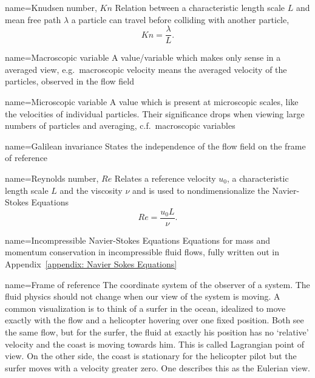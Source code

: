 
{
name={Knudsen number, $Kn$}
}
{Relation between a characteristic length scale $L$ and mean free path $\lambda$ a particle can travel before colliding with another particle,
\begin{equation}
  Kn=\frac{\lambda}{L}.
\end{equation}}

{
name={Macroscopic variable}
}
{A value/variable which makes only sense in a averaged view, e.g.\ macroscopic velocity means the averaged velocity of the particles, observed in the flow field
}

{
name={Microscopic variable}
}
{
A value which is present at microscopic scales, like the velocities of individual particles.
Their significance drops when viewing large numbers of particles and averaging, c.f.\ macroscopic variables
}

{
name={Galilean invariance}
}{States the independence of the flow field on the frame of reference}

{
name={Reynolds number, $Re$}
}
{Relates a reference velocity $u_0$, a characteristic length scale $L$ and the viscosity $\nu$ and is used to nondimensionalize the Navier-Stokes Equations
\begin{equation}
  \label{eq: definition of reynolds number}
  Re=\frac{u_0 L}{\nu}.
\end{equation}}

{
name={Incompressible Navier-Stokes Equations}
}
{Equations for mass and momentum conservation in incompressible fluid flows, fully written out in Appendix~\ref{appendix: Navier Sokes Equations}
}

{
name={Frame of reference}
}
{
The coordinate system of the observer of a system.
The fluid physics should not change when our view of the system is moving.
A common visualization is to think of a surfer in the ocean, idealized to move exactly with the flow and a helicopter hovering over one fixed position.
Both see the same flow, but for the surfer, the fluid at exactly his position has no `relative' velocity and the coast is moving towards him. This is called Lagrangian point of view.
On the other side, the coast is stationary for the helicopter pilot but the surfer moves with a velocity greater zero. One describes this as the Eulerian view.
}
